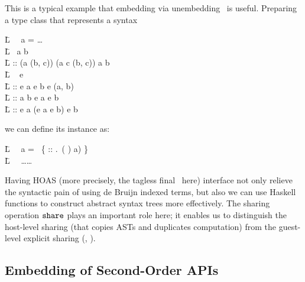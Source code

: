 \documentclass{article}
\let\cite=\citep
\theoremstyle{definition}
\newlength{\blanklineskip}
\begin{document}
This is a typical example that embedding via unembedding~\cite{Atkey09, AtLY09} is useful. 
Preparing a type class that represents a syntax 
\begin{code}
\=L ~~\Delta a = \dots \\
\=L \DATA~\A a \A b~\WHERE ~ \\
\=L \quad {} :: (a \to (b, c)) \to (\Delta a \to c \to (\Delta b, c)) \to {} \A a \A b \\[\blanklineskip]%
\=L \CLASS~ \A e~\WHERE \\
\=L \quad {} :: e \A a \to e \A b \to e \A (a, b) \\
\=L \quad {} ::  \A a \A b \to e \A a \to e \A b \\
\=L \quad {} :: e \A a \to (e \A a \to e \A b) \to e \A b 
\end{code}
we can define its instance as:
\begin{code}
\=L ~~a = ~\{  :: \forall {}.\,  \A {} \to {} \A ( \A {}) \A a) \}\\
\=L  \A {} \A {}~\WHERE~\dots {}\dots
\end{code}
Having HOAS (more precisely, the tagless final~\cite{CaKS09} here) interface not only relieve the syntactic pain of using de Bruijn indexed terms, 
but also we can use Haskell functions to construct abstract syntax trees more effectively. 
The sharing operation $\texttt{share}$ plays an important role here; it enables us to distinguish the host-level sharing (that copies ASTs and duplicates computation) from 
the guest-level explicit sharing (\ie, ).

\subsection{Embedding of Second-Order APIs}
\end{document}
